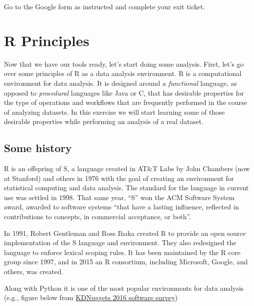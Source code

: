 \documentclass[]{book}
\theoremstyle{definition}
\theoremstyle{definition}
\theoremstyle{remark}
\begin{document}
Go to the Google form as instructed and complete your exit ticket.

\chapter{R Principles}\label{r-principles}

Now that we have our tools ready, let's start doing some analysis.
First, let's go over some principles of R as a data analysis
environment. R is a computational environment for data analysis. It is
designed around a \emph{functional} language, as opposed to
\emph{procedural} languages like Java or C, that has desirable
properties for the type of operations and workflows that are frequently
performed in the course of analyzing datasets. In this exercise we will
start learning some of those desirable properties while performing an
analysis of a real dataset.

\section{Some history}\label{some-history}

R is an offspring of S, a language created in AT\&T Labs by John
Chambers (now at Stanford) and others in 1976 with the goal of creating
an environment for statistical computing and data analysis. The standard
for the language in current use was settled in 1998. That same year,
``S'' won the ACM Software System award, awarded to software systems
``that have a lasting influence, reflected in contributions to concepts,
in commercial acceptance, or both''.

In 1991, Robert Gentleman and Ross Ihaka created R to provide an open
source implementation of the S language and environment. They also
redesigned the language to enforce lexical scoping rules. It has been
maintained by the R core group since 1997, and in 2015 an R consortium,
including Microsoft, Google, and others, was created.

Along with Python it is one of the most popular environments for data
analysis (e.g., figure below from
\href{http://www.kdnuggets.com/2016/06/r-python-top-analytics-data-mining-data-science-software.html}{KDNuggets
2016 software survey})
\end{document}
